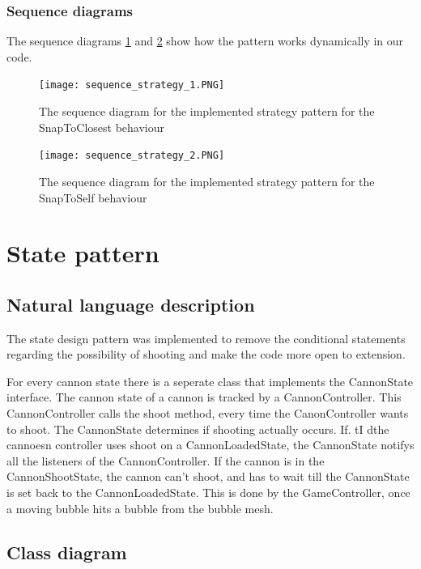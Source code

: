 \documentclass[a4paper]{article}
\begin{document}
\subsubsection{Sequence diagrams}
The sequence diagrams \ref{fig:sequence_strategy1} and \ref{fig:sequence_strategy2} show how the pattern works dynamically in our code.
\begin{figure}[H]
    \texttt{[image: sequence\_strategy\_1.PNG]}
    \caption{\label{fig:sequence_strategy1} The sequence diagram for the implemented strategy pattern for the SnapToClosest behaviour}
\end{figure}
\begin{figure}[H]
    \texttt{[image: sequence\_strategy\_2.PNG]}
    \caption{\label{fig:sequence_strategy2} The sequence diagram for the implemented strategy pattern for the SnapToSelf behaviour}
\end{figure}

\section{State pattern}

\subsection{Natural language description}
The state design pattern was implemented to remove the conditional statements regarding the possibility of shooting and make the code more open to extension. 

For every cannon state there is a seperate class that implements the CannonState interface. The cannon state of a cannon is tracked by a CannonController. This CannonController calls the shoot method, every time the CanonController wants to shoot. The CannonState determines if shooting actually occurs. If. tI dthe cannoesn controller uses shoot on a CannonLoadedState, the CannonState notifys all the listeners of the CannonController. If the cannon is in the CannonShootState, the cannon can't shoot, and has to wait till the CannonState is set back to the CannonLoadedState. This is done by the GameController, once a moving bubble hits a bubble from the bubble mesh.
\subsection{Class diagram}
\end{document}
